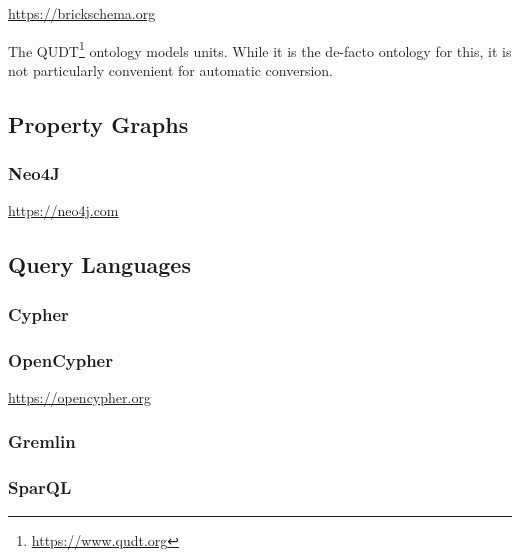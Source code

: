 \url{https://brickschema.org}



The QUDT\footnote{\url{https://www.qudt.org}} ontology models units. While it is the de-facto ontology for this, it is not particularly convenient for automatic conversion.

\subsection{Property Graphs}
\subsubsection{Neo4J}

\url{https://neo4j.com}

\subsection{Query Languages}
\subsubsection{Cypher}
\subsubsection{OpenCypher}

\url{https://opencypher.org}

\subsubsection{Gremlin}
\subsubsection{SparQL}


